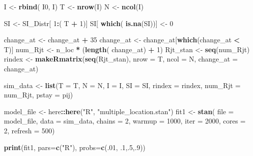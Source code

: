 \documentclass[11pt,]{article}
\newenvironment{Shaded}{\begin{snugshade}}{\end{snugshade}}
\newcommand{\KeywordTok}[1]{\textcolor[rgb]{0.13,0.29,0.53}{\textbf{#1}}}
\newcommand{\DataTypeTok}[1]{\textcolor[rgb]{0.13,0.29,0.53}{#1}}
\newcommand{\DecValTok}[1]{\textcolor[rgb]{0.00,0.00,0.81}{#1}}
\newcommand{\StringTok}[1]{\textcolor[rgb]{0.31,0.60,0.02}{#1}}
\newcommand{\OperatorTok}[1]{\textcolor[rgb]{0.81,0.36,0.00}{\textbf{#1}}}
\newcommand{\NormalTok}[1]{#1}
\begin{document}
\begin{Shaded}
\begin{Highlighting}[]
\NormalTok{I  <-}\StringTok{ }\KeywordTok{rbind}\NormalTok{( I0, I)}
\NormalTok{T  <-}\StringTok{ }\KeywordTok{nrow}\NormalTok{(I)}
\NormalTok{N  <-}\StringTok{ }\KeywordTok{ncol}\NormalTok{(I)}

\NormalTok{SI <-}\StringTok{ }\NormalTok{SI_Distr[ }\DecValTok{1}\OperatorTok{:}\NormalTok{( T }\OperatorTok{+}\StringTok{ }\DecValTok{1}\NormalTok{)]}
\NormalTok{SI[ }\KeywordTok{which}\NormalTok{( }\KeywordTok{is.na}\NormalTok{(SI))] <-}\StringTok{ }\DecValTok{0}

\NormalTok{change_at <-}\StringTok{ }\NormalTok{change_at }\OperatorTok{+}\StringTok{ }\DecValTok{35}
\NormalTok{change_at <-}\StringTok{ }\NormalTok{change_at[}\KeywordTok{which}\NormalTok{(change_at }\OperatorTok{<}\StringTok{ }\NormalTok{T)]}
\NormalTok{num_Rjt   <-}\StringTok{  }\NormalTok{n_loc }\OperatorTok{*}\StringTok{ }\NormalTok{(}\KeywordTok{length}\NormalTok{( change_at) }\OperatorTok{+}\StringTok{ }\DecValTok{1}\NormalTok{)}
\NormalTok{Rjt_stan  <-}\StringTok{ }\KeywordTok{seq}\NormalTok{(num_Rjt)}
\NormalTok{rindex    <-}\StringTok{ }\KeywordTok{makeRmatrix}\NormalTok{(}\KeywordTok{seq}\NormalTok{(Rjt_stan), }\DataTypeTok{nrow =}\NormalTok{ T, }\DataTypeTok{ncol =}\NormalTok{ N,}
                      \DataTypeTok{change_at =}\NormalTok{ change_at)}

\NormalTok{sim_data <-}\StringTok{ }\KeywordTok{list}\NormalTok{(}\DataTypeTok{T =}\NormalTok{ T, }\DataTypeTok{N =}\NormalTok{ N, }\DataTypeTok{I =}\NormalTok{ I, }\DataTypeTok{SI =}\NormalTok{ SI,}
                 \DataTypeTok{rindex =}\NormalTok{ rindex,}
                 \DataTypeTok{num_Rjt =}\NormalTok{ num_Rjt, }\DataTypeTok{pstay =}\NormalTok{ pij)}

\NormalTok{model_file <-}\StringTok{ }\NormalTok{here}\OperatorTok{::}\KeywordTok{here}\NormalTok{(}\StringTok{"R"}\NormalTok{, }\StringTok{"multiple_location.stan"}\NormalTok{)}
\NormalTok{fit1 <-}\StringTok{ }\KeywordTok{stan}\NormalTok{(}
  \DataTypeTok{file =}\NormalTok{ model_file,  }
  \DataTypeTok{data =}\NormalTok{ sim_data,   }
  \DataTypeTok{chains =} \DecValTok{2}\NormalTok{,        }
  \DataTypeTok{warmup =} \DecValTok{1000}\NormalTok{,     }
  \DataTypeTok{iter =} \DecValTok{2000}\NormalTok{,       }
  \DataTypeTok{cores =} \DecValTok{2}\NormalTok{,         }
  \DataTypeTok{refresh =} \DecValTok{500}\NormalTok{)     }

\KeywordTok{print}\NormalTok{(fit1, }\DataTypeTok{pars=}\KeywordTok{c}\NormalTok{(}\StringTok{"R"}\NormalTok{), }\DataTypeTok{probs=}\KeywordTok{c}\NormalTok{(.}\DecValTok{01}\NormalTok{, .}\DecValTok{1}\NormalTok{,.}\DecValTok{5}\NormalTok{,.}\DecValTok{9}\NormalTok{))}
\end{Highlighting}
\end{Shaded}
\end{document}
